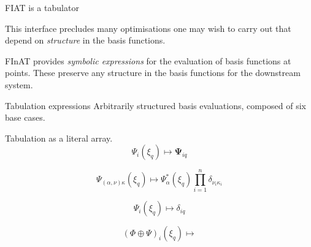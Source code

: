 \documentclass[a0paper,portrait]{baposter}
\begin{document}
\begin{poster}
\begin{posterbox}[name=introduction,span=6,column=0,row=0]{FIAT is a
      tabulator}
\begin{multicols}{2}
{      This interface precludes many optimisations one may wish to
      carry out that depend on \emph{structure} in the basis
      functions.

      FInAT provides \emph{symbolic expressions} for the evaluation
      of basis functions at points.  These preserve any structure in
      the basis functions for the downstream system.
      }
    \end{multicols}
  \end{posterbox}

  \begin{posterbox}[name=structure, column=0, below=introduction, span=3]{Tabulation expressions}
    Arbitrarily structured basis evaluations, composed of six base cases.
    \begin{tcbraster}[raster columns=6,raster equal height=rows]
    \begin{tcolorbox}[title=FIAT,left=0mm,right=0mm,top=0mm,bottom=0mm,boxsep=0.5mm,
      raster multicolumn=3, valign upper=center, halign=center]
      Tabulation as a literal array.
      \begin{equation*}
        \Psi_i(\xi_q) \mapsto \mathbf{\Psi}_{iq}
      \end{equation*}
    \end{tcolorbox}
    \begin{tcolorbox}[title=Tensor-valued,left=0mm,right=0mm,top=0mm,bottom=0mm,boxsep=0.5mm,
      raster multicolumn=3, valign upper=center]
      \begin{equation*}
        \Psi_{(\alpha, \nu)\kappa}(\xi_q) \mapsto \Psi_{\alpha}^*(\xi_q) \prod_{i=1}^n \delta_{\nu_i \kappa_i}
      \end{equation*}
    \end{tcolorbox}
    \begin{tcolorbox}[title=Underintegration,left=0mm,right=0mm,top=0mm,bottom=0mm,boxsep=0.5mm,
      raster multicolumn=2, valign upper=center]
      \begin{equation*}
        \Psi_i(\xi_q) \mapsto \delta_{iq}
      \end{equation*}
    \end{tcolorbox}
    \begin{tcolorbox}[title=Enriched,left=0mm,right=0mm,top=0mm,bottom=0mm,boxsep=0.5mm,
      raster multicolumn=4, valign upper=center]
      \begin{equation*}
        (\Phi \oplus \Psi)_i(\xi_q) \mapsto

\end{equation*}
\end{tcolorbox}
\end{tcbraster}
\end{posterbox}
\end{poster}
\end{document}
